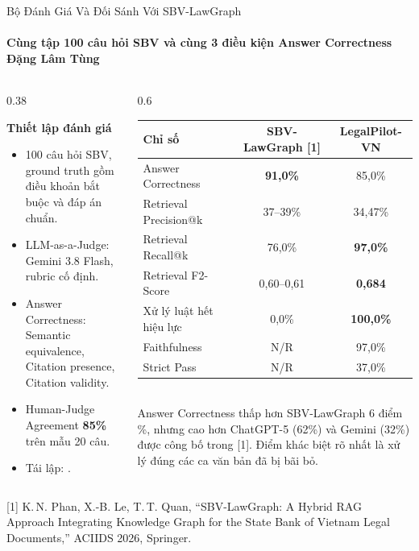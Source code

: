 \documentclass[aspectratio=1610,10pt,xcolor={table}]{beamer}
\begin{document}
\begin{frame}{Bộ Đánh Giá Và Đối Sánh Với SBV-LawGraph}
  \framesubtitle{Cùng tập 100 câu hỏi SBV và cùng 3 điều kiện Answer Correctness \hfill Đặng Lâm Tùng}

  \begin{columns}[t]
    \begin{column}{0.38\textwidth}
      \begin{block}{\textbf{Thiết lập đánh giá}}
        \begin{itemize}\footnotesize
          \item 100 câu hỏi SBV, ground truth gồm điều khoản bắt buộc và đáp án chuẩn.
          \item LLM-as-a-Judge: Gemini 3.8 Flash, rubric cố định.
          \item Answer Correctness: Semantic equivalence, Citation presence, Citation validity.
          \item Human-Judge Agreement \textbf{85\%} trên mẫu 20 câu.
          \item Tái lập: .
        \end{itemize}
      \end{block}
    \end{column}

    \begin{column}{0.6\textwidth}
      \footnotesize
      \begin{tabular}{@{}lcc@{}}
        \toprule
        \textbf{Chỉ số} & \textbf{SBV-LawGraph [1]} & \textbf{LegalPilot-VN} \\
        \midrule
        Answer Correctness & \textbf{91,0\%} & 85,0\% \\
        Retrieval Precision@k & 37--39\% & 34,47\% \\
        Retrieval Recall@k & 76,0\% & \textbf{97,0\%} \\
        Retrieval F2-Score & 0,60--0,61 & \textbf{0,684} \\
        Xử lý luật hết hiệu lực & 0,0\% & \textbf{100,0\%} \\
        Faithfulness & N/R & 97,0\% \\
        Strict Pass & N/R & 37,0\% \\
        \bottomrule
      \end{tabular}\\[0.15cm]
      Answer Correctness thấp hơn SBV-LawGraph 6 điểm \%, nhưng cao hơn ChatGPT-5 (62\%) và Gemini (32\%) được công bố trong [1]. Điểm khác biệt rõ nhất là xử lý đúng các ca văn bản đã bị bãi bỏ.
    \end{column}
  \end{columns}

  \vfill
  {\tiny\color{gray}[1] K.\,N. Phan, X.-B. Le, T.\,T. Quan, ``SBV-LawGraph: A Hybrid RAG Approach Integrating Knowledge Graph for the State Bank of Vietnam Legal Documents,'' ACIIDS 2026, Springer.}
\end{frame}
\end{document}
